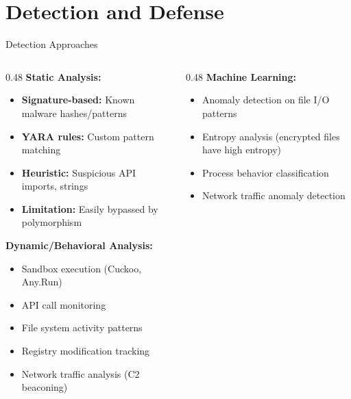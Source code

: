 \documentclass[aspectratio=169]{beamer}
\begin{document}
\section{Detection and Defense}

\begin{frame}{Detection Approaches}
  \begin{columns}[T]
    \begin{column}{0.48\textwidth}
      \textbf{Static Analysis:}
      \begin{itemize}
        \item \textbf{Signature-based:} Known malware hashes/patterns
        \item \textbf{YARA rules:} Custom pattern matching
        \item \textbf{Heuristic:} Suspicious API imports, strings
        \item \textbf{Limitation:} Easily bypassed by polymorphism
      \end{itemize}

      \vspace{0.5em}
      \textbf{Dynamic/Behavioral Analysis:}
      \begin{itemize}
        \item Sandbox execution (Cuckoo, Any.Run)
        \item API call monitoring
        \item File system activity patterns
        \item Registry modification tracking
        \item Network traffic analysis (C2 beaconing)
      \end{itemize}
    \end{column}
    \begin{column}{0.48\textwidth}
      \textbf{Machine Learning:}
      \begin{itemize}
        \item Anomaly detection on file I/O patterns
        \item Entropy analysis (encrypted files have high entropy)
        \item Process behavior classification
        \item Network traffic anomaly detection
      \end{itemize}


\end{column}
\end{columns}
\end{frame}
\end{document}
